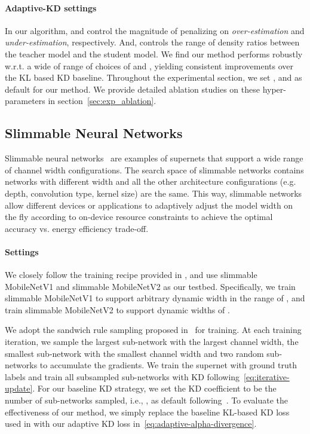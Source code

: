 \documentclass{article}
\begin{document}
\paragraph{Adaptive-KD settings}
In our algorithm,  and  control the magnitude of penalizing on \emph{over-estimation} and \emph{under-estimation}, respectively. And,  controls the range of density ratios between the teacher model and the student model.
We find our method performs robustly w.r.t. a wide of range of choices of  and , yielding consistent improvements over the KL based KD baseline.  
Throughout the experimental section, we set ,  and  as default for our method. We provide detailed ablation studies on these hyper-parameters in section~\ref{sec:exp_ablation}. 

\subsection{Slimmable  Neural Networks}
\label{sec:exp_slimmable}
Slimmable neural networks~\citep{yu2018slimmable, yu2019universally} are examples of supernets that support a wide range of channel width configurations. The search space  of slimmable networks contains networks with different width and all the other architecture configurations (e.g. depth, convolution type, kernel size) are the same.
This way, 
slimmable networks allow different devices or applications to adaptively adjust the model width on the fly according to on-device resource constraints to achieve the optimal accuracy vs. energy efficiency trade-off. 


\paragraph{Settings}
We closely follow the training recipe provided in \citet{yu2019universally}, 
and use slimmable MobileNetV1 \citep{howard2017mobilenets} 
and slimmable MobileNetV2 \citep{sandler2018mobilenetv2} as our testbed.
Specifically, we train slimmable MobileNetV1 to support arbitrary dynamic width in the range of , and train slimmable MobileNetV2 to support 
dynamic widths of . 

We adopt the sandwich rule sampling proposed in~\citet{yu2019universally} for training. At each training iteration, 
we sample the largest sub-network with the largest channel width, 
the smallest sub-network with the smallest channel width and two random sub-networks to accumulate the gradients.
We train the supernet with ground truth labels and 
train all subsampled sub-networks with KD following~\eqref{eq:iterative-update}. 
For our baseline KD strategy, we set the KD coefficient  to be the number of sub-networks sampled, i.e., , as default  following~\citet{yu2019universally}.
To evaluate the effectiveness of our method, 
we simply replace the baseline KL-based KD loss used in \citet{yu2019universally} with our adaptive KD loss in~\eqref{eq:adaptive-alpha-divergence}. 
\end{document}
